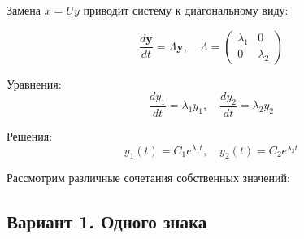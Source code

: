 	Замена $x = U y$ приводит систему к диагональному виду:
	
	\begin{equation}
		\frac{d \mathbf{y}}{d t} = \Lambda \mathbf{y}, \quad \Lambda = \begin{pmatrix} \lambda_1 & 0 \\ 0 & \lambda_2 \end{pmatrix}
	\end{equation}
	
	Уравнения:
	\begin{equation}
		\frac{d y_1}{d t} = \lambda_1 y_1, \quad \frac{d y_2}{d t} = \lambda_2 y_2
	\end{equation}
	
	Решения:
	\begin{equation}
		y_1(t) = C_1 e^{\lambda_1 t}, \quad y_2(t) = C_2 e^{\lambda_2 t}
	\end{equation}
	
	\newpage
	Рассмотрим различные сочетания собственных значений:
	
	\begin{pinkbox}
		\subsection*{Вариант 1. Одного знака}
	\end{pinkbox}
	
